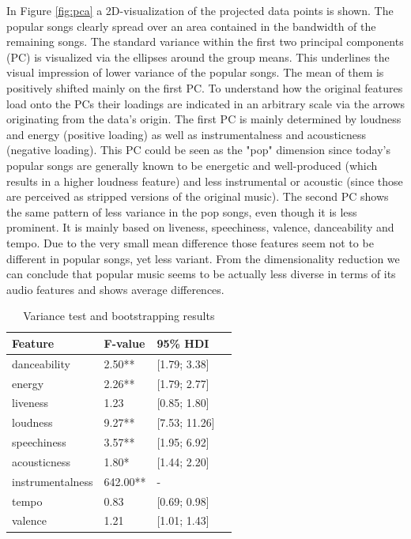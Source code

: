 \documentclass{article}
\begin{document}
In Figure \ref{fig:pca} a 2D-visualization of the projected data points is shown. The popular songs clearly spread over an area contained in the bandwidth of the remaining songs. The standard variance within the first two principal components (PC) is visualized via the ellipses around the group means. This underlines the visual impression of lower variance of the popular songs. The mean of them is positively shifted mainly on the first PC. To understand how the original features load onto the PCs their loadings are indicated in an arbitrary scale via the arrows originating from the data's origin. The first PC is mainly determined by loudness and energy (positive loading) as well as instrumentalness and acousticness (negative loading). This PC could be seen as the "pop" dimension since today's popular songs are generally known to be energetic and well-produced (which results in a higher loudness feature) and less instrumental or acoustic (since those are perceived as stripped versions of the original music). The second PC shows the same pattern of less variance in the pop songs, even though it is less prominent. It is mainly based on liveness, speechiness, valence, danceability and tempo. Due to the very small mean difference those features seem not to be different in popular songs, yet less variant. From the dimensionality reduction we can conclude that popular music seems to be actually less diverse in terms of its audio features and shows average differences.

\begin{table}[h!]
  
  \label{tab:var}
  \centering
  \begin{tabular}{lllc}
    \toprule
    Feature     & F-value & 95\% HDI\\
    \midrule
	danceability        	&  2.50** & [1.79; 3.38]\\
	energy              		&  2.26** & [1.79; 2.77]\\
	liveness            		&  1.23   & [0.85; 1.80]\\
	loudness            	&  9.27** & [7.53; 11.26]\\
	speechiness         	&  3.57** & [1.95; 6.92]\\
	acousticness        	&  1.80*  & [1.44; 2.20]\\
	instrumentalness    	&642.00** & -\\
	tempo               		&  0.83   & [0.69; 0.98]\\
	valence             	&  1.21   & [1.01; 1.43]\\
    \bottomrule
  \end{tabular}
  \vspace*{2mm}
  \caption{Variance test and bootstrapping results}
\end{table}
\end{document}
